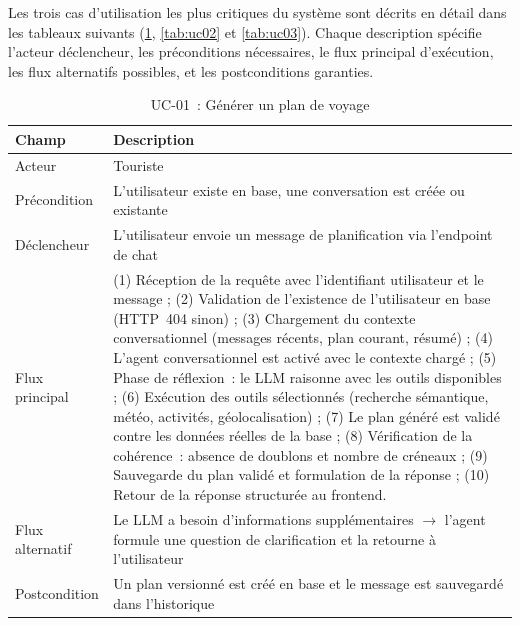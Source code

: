 Les trois cas d'utilisation les plus critiques du système sont décrits en détail dans les
tableaux suivants (\ref{tab:uc01}, \ref{tab:uc02} et \ref{tab:uc03}). Chaque description spécifie l'acteur déclencheur, les préconditions
nécessaires, le flux principal d'exécution, les flux alternatifs possibles, et les
postconditions garanties.

\begin{table}[H]
    \centering
    \caption{UC-01~: Générer un plan de voyage}
    \label{tab:uc01}
    \small
    \begin{tabular}{p{3cm} p{11cm}}
        \toprule
        \textbf{Champ} & \textbf{Description} \\
        \midrule
        Acteur & Touriste \\[3pt]
        Précondition & L'utilisateur existe en base, une conversation est créée ou existante \\[3pt]
        Déclencheur & L'utilisateur envoie un message de planification via l'endpoint de chat \\[3pt]
        Flux principal &
        (1) Réception de la requête avec l'identifiant utilisateur et le message ;
        (2) Validation de l'existence de l'utilisateur en base (HTTP~404 sinon) ;
        (3) Chargement du contexte conversationnel (messages récents, plan courant, résumé) ;
        (4) L'agent conversationnel est activé avec le contexte chargé ;
        (5) Phase de réflexion~: le LLM raisonne avec les outils disponibles ;
        (6) Exécution des outils sélectionnés (recherche sémantique, météo, activités, géolocalisation) ;
        (7) Le plan généré est validé contre les données réelles de la base ;
        (8) Vérification de la cohérence~: absence de doublons et nombre de créneaux ;
        (9) Sauvegarde du plan validé et formulation de la réponse ;
        (10) Retour de la réponse structurée au frontend. \\[3pt]
        Flux alternatif & Le LLM a besoin d'informations supplémentaires $\rightarrow$ l'agent
        formule une question de clarification et la retourne à l'utilisateur \\[3pt]
        Postcondition & Un plan versionné est créé en base et le message est sauvegardé dans l'historique \\
        \bottomrule
    \end{tabular}
\end{table}

